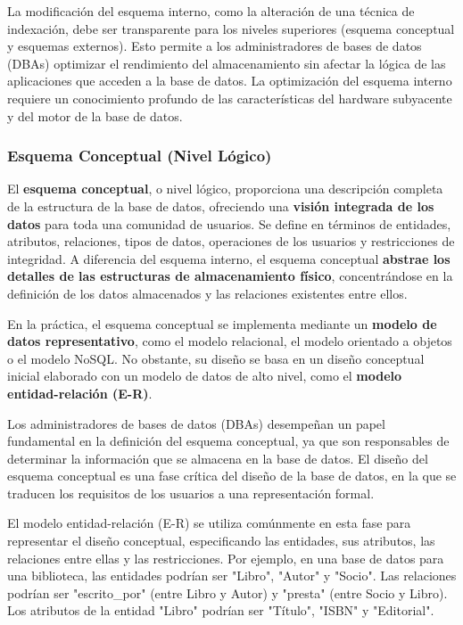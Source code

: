 La modificación del esquema interno, como la alteración de una técnica de indexación, debe ser transparente para los niveles superiores (esquema conceptual y esquemas externos).  Esto permite a los administradores de bases de datos (DBAs) optimizar el rendimiento del almacenamiento sin afectar la lógica de las aplicaciones que acceden a la base de datos.  La optimización del esquema interno requiere un conocimiento profundo de las características del hardware subyacente y del motor de la base de datos.

\subsubsection{Esquema Conceptual (Nivel Lógico)}

El \textbf{esquema conceptual}, o nivel lógico, proporciona una descripción completa de la estructura de la base de datos, ofreciendo una \textbf{visión integrada de los datos} para toda una comunidad de usuarios. Se define en términos de entidades, atributos, relaciones, tipos de datos, operaciones de los usuarios y restricciones de integridad. A diferencia del esquema interno, el esquema conceptual \textbf{abstrae los detalles de las estructuras de almacenamiento físico}, concentrándose en la definición de los datos almacenados y las relaciones existentes entre ellos.

En la práctica, el esquema conceptual se implementa mediante un \textbf{modelo de datos representativo}, como el modelo relacional, el modelo orientado a objetos o el modelo NoSQL. No obstante, su diseño se basa en un diseño conceptual inicial elaborado con un modelo de datos de alto nivel, como el \textbf{modelo entidad-relación (E-R)}.

Los administradores de bases de datos (DBAs) desempeñan un papel fundamental en la definición del esquema conceptual, ya que son responsables de determinar la información que se almacena en la base de datos. El diseño del esquema conceptual es una fase crítica del diseño de la base de datos, en la que se traducen los requisitos de los usuarios a una representación formal.

El modelo entidad-relación (E-R) se utiliza comúnmente en esta fase para representar el diseño conceptual, especificando las entidades, sus atributos, las relaciones entre ellas y las restricciones. Por ejemplo, en una base de datos para una biblioteca, las entidades podrían ser "Libro", "Autor" y "Socio".  Las relaciones podrían ser "escrito\_por" (entre Libro y Autor) y "presta" (entre Socio y Libro). Los atributos de la entidad "Libro" podrían ser "Título", "ISBN" y "Editorial".

